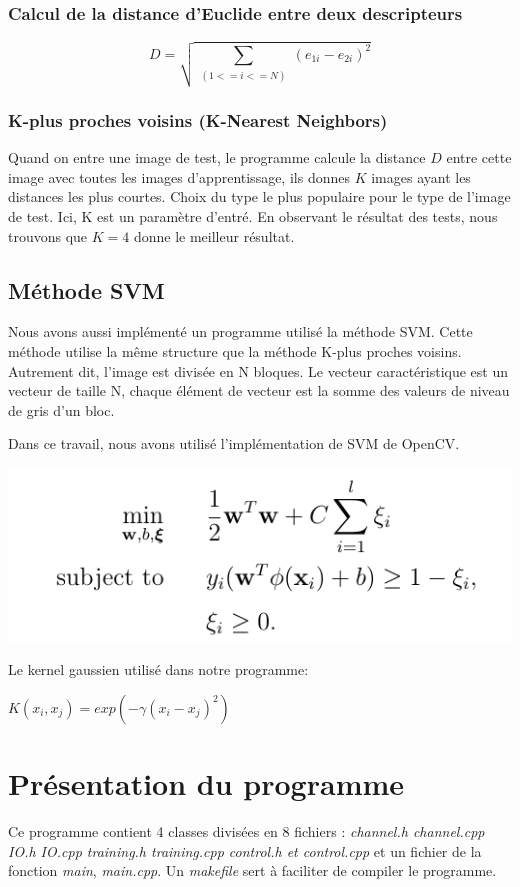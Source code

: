 \documentclass[]{article}   %
\begin{document}
\subsubsection{Calcul de la distance d'Euclide entre deux descripteurs}
\begin{equation}
D = \sqrt{\sum_{\substack{
   	(1<=i<=N)}} (e_{1i} - e_{2i})^2}
\end{equation}
\subsubsection{K-plus proches voisins (K-Nearest Neighbors)}
Quand on entre une image de test, le programme calcule la distance $D$ entre cette image avec toutes les images d'apprentissage, ils donnes $K$ images ayant les distances les plus courtes. Choix du type le plus populaire pour le type de l'image de test. Ici, K est un paramètre d'entré. En observant le résultat des tests, nous trouvons que $K = 4$ donne le meilleur résultat.
\subsection{Méthode SVM}
Nous avons aussi implémenté un programme utilisé la méthode SVM. Cette méthode utilise la 
même structure que la méthode K-plus proches voisins. Autrement dit, l'image est divisée 
en N bloques. Le vecteur caractéristique est un vecteur de taille N, chaque élément de 
vecteur est la somme des valeurs de niveau de gris d'un bloc. 

Dans ce travail, nous avons utilisé l'implémentation de SVM de OpenCV.

\begin{center}
 \includegraphics{./images/svm.png}
\end{center}

Le kernel gaussien utilisé dans notre programme:
\begin{center}
$K(x_{i}, x_{j}) = exp(-\gamma(x_{i}- x_{j})^2)$
\end{center}

\section{Présentation du programme}
Ce programme contient 4 classes divisées en 8 fichiers : \textit{channel.h channel.cpp IO.h IO.cpp training.h training.cpp control.h et control.cpp} et un fichier de la fonction \textit{main}, \textit{main.cpp}. Un \textit{makefile} sert à faciliter de compiler le programme.
\end{document}
